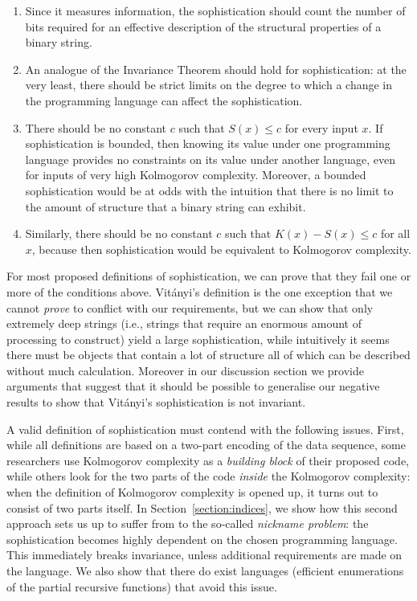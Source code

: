\documentclass{style/llncs}
\begin{document}
\begin{enumerate}
\item Since it measures information, the sophistication should count the number of bits required for an effective description of the structural properties of a binary string.
\item An analogue of the Invariance Theorem should hold for sophistication: at the very least, there should be strict limits on the degree to which a change in the programming language can affect the sophistication.
\item There should be no constant $c$ such that $S(x)\le c$ for every input $x$. If sophistication is bounded, then knowing its value under one programming language provides no constraints on its value under another language, even for inputs of very high Kolmogorov complexity. Moreover, a bounded sophistication would be at odds with the intuition that there is no limit to the amount of structure that a binary string can exhibit.
\item Similarly, there should be no constant $c$ such that $K(x)-S(x)\le c$ for all $x$, because then sophistication would be equivalent to Kolmogorov complexity. 
\end{enumerate}

For most proposed definitions of sophistication, we can prove that they fail one or more of the conditions above. Vit\'anyi's definition \cite{vitanyi2004meaningful} is the one exception that we cannot \emph{prove} to conflict with our requirements, but we can show that only extremely deep strings (i.e., strings that require an enormous amount of processing to construct) yield a large sophistication, while intuitively it seems there must be objects that contain a lot of structure all of which can be described without much calculation. Moreover in our discussion section we provide arguments that suggest that it should be possible to generalise our negative results to show that Vit\'anyi's sophistication is not invariant.

A valid definition of sophistication must contend with the following issues. First, while all definitions are based on a two-part encoding of the data sequence, some researchers use Kolmogorov complexity as a \emph{building block} of their proposed code, while others look for the two parts of the code \emph{inside} the Kolmogorov complexity: when the definition of Kolmogorov complexity is opened up, it turns out to consist of two parts itself. In Section~\ref{section:indices}, we show how this second approach sets us up to suffer from to the so-called \emph{nickname problem}: the sophistication becomes highly dependent on the chosen programming language. This immediately breaks invariance, unless additional requirements are made on the language. We also show that there do exist languages (efficient enumerations of the partial recursive functions) that avoid this issue.
\end{document}
